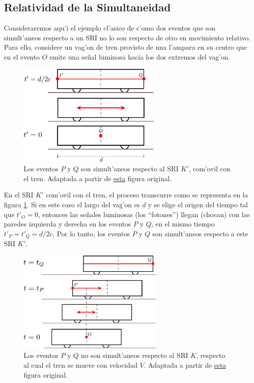 \subsection{Relatividad de la Simultaneidad}
Consideraremos aqu'i el ejemplo cl'asico de c'omo dos eventos que son simult'aneos respecto a un SRI no lo son respecto de otro en movimiento relativo. Para ello, considere un vag'on de tren provisto de una l'ampara en su centro que en el evento $O$ emite una se\~nal luminosa hacia los dos extremos del vag'on.
\begin{figure}[H]
\centerline{\includegraphics[height= 5cm]{fig/fig-diagrama-simultaneidad-01.pdf}}
\caption{Los eventos $P$ y $Q$ son simult'aneos respecto al SRI $K'$, com'ovil con el tren. Adaptada a partir de \href{https://commons.wikimedia.org/wiki/File:Traincar_Relativity1.svg}{esta} figura original.}
\label{sim01}
\end{figure}
En el SRI $K'$ com'ovil con el tren, el proceso transcurre como se representa en la figura \ref{sim01}. Si en este caso el largo del vag'on es $d$ y se elige el origen del tiempo tal que $t'_O=0$, entonces las se\~nales luminosas (los ``fotones'') llegan (chocan) con las paredes izquierda y derecha en los eventos $P$ y $Q$, en el mismo tiempo $t'_P=t'_Q=d/2c$. Por lo tanto, los eventos $P$ y $Q$ son simult'aneos respecto a este SRI $K'$.
\begin{figure}[H]
\centerline{\includegraphics[height= 5cm]{fig/fig-diagrama-simultaneidad-02.pdf}}
\caption{Los eventos $P$ y $Q$ no son simult'aneos respecto al SRI $K$, respecto al cual el tren se mueve con velocidad $V$. Adaptada a partir de \href{https://commons.wikimedia.org/wiki/File:Traincar_Relativity2.svg}{esta} figura original.}
\label{sim02}
\end{figure}

